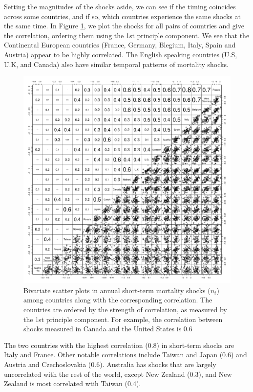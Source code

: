 \documentclass[12pt]{article}
\begin{document}
Setting the magnitudes of the shocks aside, we can see if the timing
coincides across some countries, and if so, which countries experience
the same shocks at the same time.  In Figure \ref{nt_corr_fig}, we plot the shocks for
all pairs of countries and give the correlation, ordering them using
the 1st principle component. We see that the Continental European
countries (France, Germany, Blegium, Italy, Spain and Austria) appear
to be highly correlated. The English speaking countries (U.S, U.K, and
Canada) also have similar temporal patterns of mortality shocks. 

\begin{figure}
  \includegraphics[width=1.05\textwidth]{./../code/nt_corr_plot.pdf}
  \caption{Bivariate scatter plots in annual short-term mortality
    shocks ($n_t$) among countries along with the corresponding
    correlation. The countries are ordered by the strength of
    correlation, as measured by the 1st principle component.  For
    example, the correlation between shocks measured in Canada and
    the United States is 0.6}
    \label{nt_corr_fig}
\end{figure}

The two countries with the highest correlation (0.8) in short-term
shocks are Italy and France. Other notable correlations include Taiwan
and Japan (0.6) and Austria and Czechoslovakia (0.6). Australia has
shocks that are largely uncorrelated with the rest of the world,
except New Zealand (0.3), and New Zealand is most correlated wtih
Taiwan (0.4).
\end{document}
